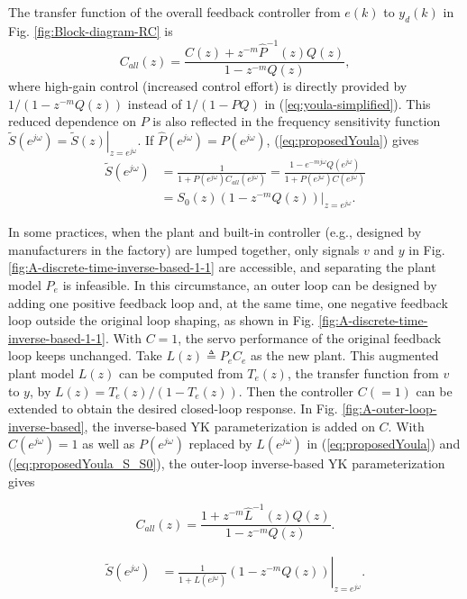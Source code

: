 \documentclass [11pt, proquest] {uwthesis}[2020/02/24]
\begin{document}
The transfer function of the overall feedback controller from $e(k)$ to $y_d(k)$ in Fig. \ref{fig:Block-diagram-RC}
is
\begin{equation}
C_{all}(z)=\frac{C(z)+z^{-m}\hat{P}^{-1}(z)Q(z)}{1-z^{-m}Q(z)},\label{eq:proposedYoula}
\end{equation}
where high-gain control (increased control effort) is directly provided
by $1/(1-z^{-m}Q(z))$ instead of $1/(1-PQ)$ in (\ref{eq:youla-simplified}).
This reduced dependence on $P$ is also reflected in the frequency
sensitivity function $\tilde{S}(e^{j\omega})=\left.\tilde{S}(z)\right|_{z=e^{j\omega}}$.
If $\hat{P}(e^{j\omega})=P(e^{j\omega})$, (\ref{eq:proposedYoula})
gives
\begin{align}
\tilde{S}(e^{j\omega}) & =\frac{1}{1+P(e^{j\omega})C_{all}(e^{j\omega})}=\frac{1-e^{-mj\omega}Q(e^{j\omega})}{1+P(e^{j\omega})C(e^{j\omega})}\nonumber \\
 & =\left.S_{0}(z)(1-z^{-m}Q(z))\right|_{z=e^{j\omega}}.\label{eq:proposedYoula_S_S0}
\end{align}

In some practices, when the plant and built-in controller (e.g.,
designed by manufacturers in the factory) are lumped together, only
signals $v$ and $y$ in Fig. \ref{fig:A-discrete-time-inverse-based-1-1}
are accessible, and separating the plant model $P_{e}$ is infeasible.
In this circumstance, an outer loop can be designed by adding one
positive feedback loop and, at the same time, one negative feedback
loop outside the original loop shaping, as shown in Fig. \ref{fig:A-discrete-time-inverse-based-1-1}.
With $C=1$, the servo performance of the original feedback loop keeps
unchanged. Take $L(z)\triangleq P_{e}C_{e}$ as the new plant. This
augmented plant model $L(z)$ can be computed from $T_{e}(z)$, the
transfer function from $v$ to $y$, by $L(z)=T_{e}(z)/(1-T_{e}(z))$.
Then the controller $C(=1)$ can be extended to obtain the desired
closed-loop response. In Fig. \ref{fig:A-outer-loop-inverse-based},
the inverse-based YK parameterization is added on $C$. With $C(e^{j\omega})=1$
as well as $P(e^{j\omega})$ replaced by $L(e^{j\omega})$ in (\ref{eq:proposedYoula})
and (\ref{eq:proposedYoula_S_S0}), the outer-loop inverse-based YK
parameterization gives

\begin{equation}
C_{all}(z)=\frac{1+z^{-m}\hat{L}^{-1}(z)Q(z)}{1-z^{-m}Q(z)}.\label{eq:outer_loop_Youla}
\end{equation}

\begin{align}
\tilde{S}(e^{j\omega}) & =\left.\frac{1}{1+L(e^{j\omega})}(1-z^{-m}Q(z))\right|_{z=e^{j\omega}}.\label{eq:L_S_frequency response}
\end{align}
\end{document}

